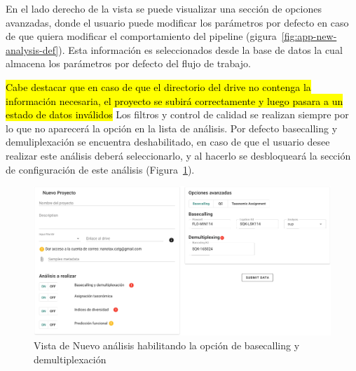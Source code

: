 \begin{itemize}
En el lado derecho de la vista se puede visualizar una sección de opciones avanzadas, donde el usuario puede modificar los parámetros por defecto en caso de que quiera modificar el comportamiento del pipeline (gigura~\ref{fig:app-new-analysis-def}). Esta información es seleccionados desde la base de datos la cual almacena los parámetros por defecto del flujo de trabajo.

\hl{Cabe destacar que en caso de que el directorio del drive no contenga la información necesaria, el proyecto se subirá correctamente y luego pasara a un estado de datos inválidos }
Los filtros y control de calidad se realizan siempre por lo que no aparecerá la opción en la lista de análisis.
Por defecto basecalling y demuliplexación se encuentra deshabilitado, en caso de que el usuario desee realizar este análisis deberá seleccionarlo, y al hacerlo se desbloqueará la sección de configuración de este análisis (Figura~\ref{fig:app-new-analysis-basecallingON}).



\begin{figure}[H]
    \includegraphics[width=1\linewidth]{images/app/newAnalysis/new-analysis-basecallingON.png}

    \caption{Vista de Nuevo análisis habilitando la opción de basecalling y demultiplexación}
    \label{fig:app-new-analysis-basecallingON}
\end{figure}


\end{itemize}
